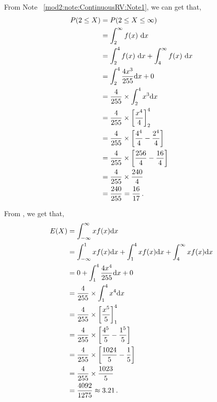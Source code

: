 \begin{subquestions}
\begin{subsubquestions}
From Note ~\ref{mod2:note:ContinuousRV:Note1}, we can get that,
\begin{align}
	P(2 \leq X) &= P(2\leq X \leq \infty) \nonumber \\
	                                 & = \int_2^{\infty} f(x)~\mathrm{d}x \nonumber \\
	                                 & = \int_2^{4} f(x)~\mathrm{d}x+\int_4^{\infty} f(x)~\mathrm{d}x \nonumber \\
	                                 & = \int_{2}^{4} \frac{4x^3}{255} \mathrm{d}x + 0 \nonumber \\
	                                 & = \frac{4}{255} \times \int_2^4 x^3\mathrm{d}x \nonumber \\
	                                 & = \frac{4}{255} \times \left[\frac{x^4}{4}\right]^4_2 \nonumber \\
	                                 & = \frac{4}{255} \times \left[\frac{4^4}{4}-\frac{2^4}{4}\right] \nonumber \\
	                                 & = \frac{4}{255} \times \left[\frac{256}{4}-\frac{16}{4}\right] \nonumber \\
	                                 & = \frac{4}{255} \times \frac{240}{4} \nonumber \\
	                                 & = \frac{240}{255} = \frac{16}{17} \,.
\end{align}
	

\subsubquestion

From , we get that,
\begin{align}
	E(X) & = \int_{-\infty}^{\infty} x f(x)\mathrm{d}x \nonumber \\
		 & = \int_{-\infty}^{1}xf(x)\mathrm{d}x + \int_{1}^{4} xf(x)\mathrm{d}x + \int_{4}^{\infty} xf(x)\mathrm{d}x \nonumber \\
		 & = 0 + \int_{1}^{4} \frac{4x^4}{255} \mathrm{d}x + 0 \nonumber \\
	     & = \frac{4}{255} \times \int_{1}^{4} x^4 \mathrm{d}x \nonumber \\
	     & = \frac{4}{255} \times \left[\frac{x^5}{5}\right]^4_1 \nonumber \\
	     & = \frac{4}{255} \times \left[\frac{4^5}{5} - \frac{1^5}{5}\right] \nonumber \\
	     & = \frac{4}{255} \times \left[\frac{1024}{5} - \frac{1}{5}\right] \nonumber \\
	     & = \frac{4}{255} \times \frac{1023}{5} \nonumber \\
	     & = \frac{4092}{1275} \approx 3.21 \,. 
\end{align}


\end{subsubquestions}
\end{subquestions}
